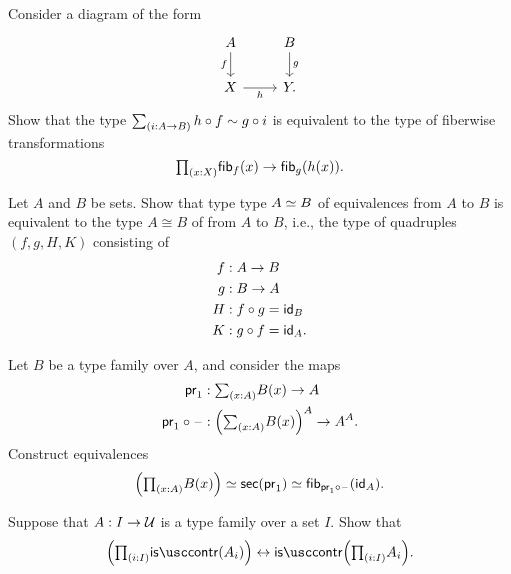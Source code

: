 \begin{exercises}
\begin{subexenum}
\end{subexenum}
\item \label{ex:sq_fib}Consider a diagram of the form
\begin{equation*}
\begin{tikzcd}
A \arrow[d,swap,"f"] & B \arrow[d,"g"] \\
X \arrow[r,swap,"h"] & Y.
\end{tikzcd}
\end{equation*}
Show that the type $\sm{i:A\to B}h\circ f\htpy g\circ i$ is equivalent to the type of fiberwise transformations
\begin{equation*}
\prd{x:X}\fib{f}{x}\to\fib{g}{h(x)}.
\end{equation*}
\item \label{ex:iso_equiv}Let $A$ and $B$ be sets. Show that type type $\eqv{A}{B}$ of equivalences from $A$ to $B$ is equivalent to the type $A\cong B$ of  from $A$ to $B$, i.e., the type of quadruples $(f,g,H,K)$ consisting of
\begin{align*}
f & : A\to B \\
g & : B\to A \\
H & : f\circ g = \idfunc[B] \\
K & : g\circ f = \idfunc[A].
\end{align*}
\item \label{ex:pi_sec}Let $B$ be a type family over $A$, and consider the maps
  \begin{align*}
    \proj 1 & : \sm{x:A} B(x)\to A \\
    \proj1 \circ \blank & : \Big(\sm{x:A} B(x)\Big)^A \to A^A.
  \end{align*}
  Construct equivalences
  \begin{equation*}
    \Big(\prd{x:A}B(x)\Big) \eqvsym \mathsf{sec}(\proj 1) \eqvsym \fib{\proj 1 \circ\blank}{\idfunc[A]}.
  \end{equation*}
\item Suppose that $A:I\to \UU$ is a type family over a set $I$. Show that
  \begin{equation*}
    \Big(\prd{i:I}\iscontr(A_i)\Big)\leftrightarrow \iscontr\Big(\prd{i:I}A_i\Big).
  \end{equation*}
\end{exercises}
